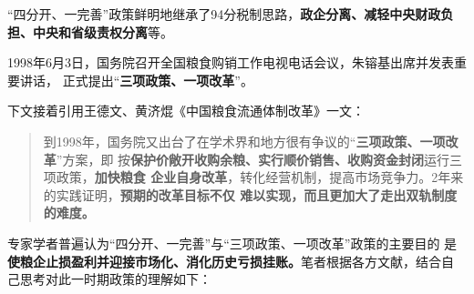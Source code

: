 “四分开、一完善”政策鲜明地继承了94分税制思路，\textbf{政企分离、减轻中央财政负
  担、中央和省级责权分离}等。

1998年6月3日，国务院召开全国粮食购销工作电视电话会议，朱镕基出席并发表重要讲话，
正式提出“\textbf{三项政策、一项改革}”。

下文接着引用王德文、黄济焜《中国粮食流通体制改革》一文：
\begin{quotation}
  到1998年，国务院又出台了在学术界和地方很有争议的“\textbf{三项政策、一项改革}”方案，即
  按\textbf{保护价敞开收购余粮、实行顺价销售、收购资金封闭}运行三项政策，\textbf{加快粮食
    企业自身改革}，转化经营机制，提高市场竞争力。2年来的实践证明，\textbf{预期的改革目标不仅
    难以实现，而且更加大了走出双轨制度的难度。}\cite{shuangguizhi}
\end{quotation}

专家学者普遍认为“四分开、一完善”与“三项政策、一项改革”政策的主要目的
是\textbf{使粮企止损盈利并迎接市场化、消化历史亏损挂账。}笔者根据各方文献，结合自
己思考对此一时期政策的理解如下：

